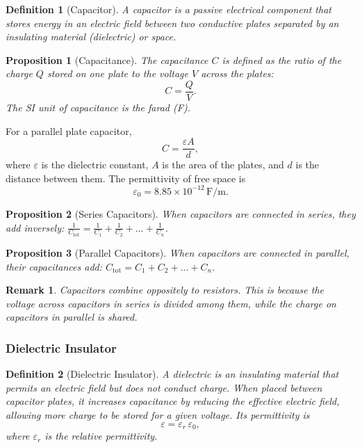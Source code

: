 \documentclass{article}
\newtheorem{definition}{Definition}
\newtheorem{remark}{Remark}
\newtheorem{proposition}{Proposition}
\begin{document}
\begin{definition}[Capacitor]
    A capacitor is a passive electrical component that stores energy in an electric field between two conductive plates separated by an insulating material (dielectric) or space.
\end{definition}
\begin{proposition}[Capacitance]
    The capacitance \(C\) is defined as the ratio of the charge \(Q\) stored on one plate to the voltage \(V\) across the plates:
    \begin{equation}
        \label{eq:capacitance}
        C = \frac{Q}{V}.
    \end{equation}
    The SI unit of capacitance is the farad (F).
\end{proposition}
For a parallel plate capacitor,
\[C = \frac{\varepsilon A}{d},\]
where \(\varepsilon\) is the dielectric constant, \(A\) is the area of the plates, and \(d\) is the distance between them. The permittivity of free space is
\[\varepsilon_0 = 8.85 \times 10^{-12}\,\text{F/m}.\]
\begin{proposition}[Series Capacitors]
    When capacitors are connected in series, they add inversely: $\frac{1}{C_{\text{tot}}} = \frac{1}{C_1} + \frac{1}{C_2} + \ldots + \frac{1}{C_n}$.
\end{proposition}
\begin{proposition}[Parallel Capacitors]
    When capacitors are connected in parallel, their capacitances add: $C_{\text{tot}} = C_1 + C_2 + \ldots + C_n$.
\end{proposition}
\begin{remark}
    Capacitors combine oppositely to resistors. This is because the voltage across capacitors in series is divided among them, while the charge on capacitors in parallel is shared.
\end{remark}

\subsubsection{Dielectric Insulator}
\begin{definition}[Dielectric Insulator]
    A dielectric is an insulating material that permits an electric field but does not conduct charge. When placed between capacitor plates, it increases capacitance by reducing the effective electric field, allowing more charge to be stored for a given voltage. Its permittivity is
    \[\varepsilon = \varepsilon_r\,\varepsilon_0,\]
    where $\varepsilon_r$ is the relative permittivity.
\end{definition}
\end{document}
